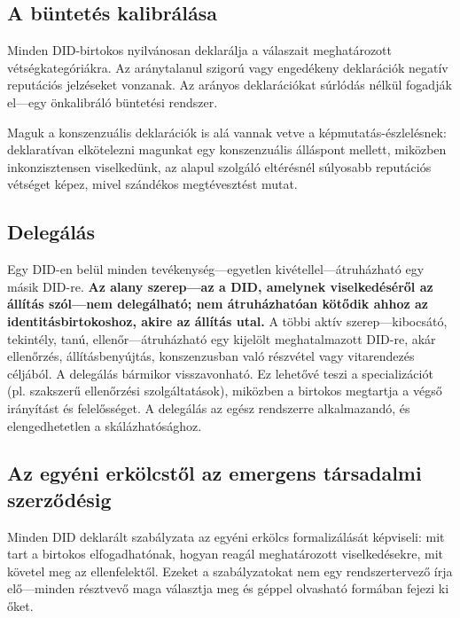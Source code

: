 \documentclass[11pt,a4paper,twocolumn]{article}
\begin{document}
\subsection{A büntetés kalibrálása}

Minden DID-birtokos nyilvánosan deklarálja a válaszait meghatározott vétségkategóriákra. Az aránytalanul szigorú vagy engedékeny deklarációk negatív reputációs jelzéseket vonzanak. Az arányos deklarációkat súrlódás nélkül fogadják el---egy önkalibráló büntetési rendszer.

Maguk a konszenzuális deklarációk is alá vannak vetve a képmutatás-észlelésnek: deklaratívan elkötelezni magunkat egy konszenzuális álláspont mellett, miközben inkonzisztensen viselkedünk, az alapul szolgáló eltérésnél súlyosabb reputációs vétséget képez, mivel szándékos megtévesztést mutat.

\subsection{Delegálás}

Egy DID-en belül minden tevékenység---egyetlen kivétellel---átruházható egy másik DID-re. \textbf{Az alany szerep---az a DID, amelynek viselkedéséről az állítás szól---nem delegálható; nem átruházhatóan kötődik ahhoz az identitásbirtokoshoz, akire az állítás utal.} A többi aktív szerep---kibocsátó, tekintély, tanú, ellenőr---átruházható egy kijelölt meghatalmazott DID-re, akár ellenőrzés, állításbenyújtás, konszenzusban való részvétel vagy vitarendezés céljából. A delegálás bármikor visszavonható. Ez lehetővé teszi a specializációt (pl. szakszerű ellenőrzési szolgáltatások), miközben a birtokos megtartja a végső irányítást és felelősséget. A delegálás az egész rendszerre alkalmazandó, és elengedhetetlen a skálázhatósághoz.

\subsection{Az egyéni erkölcstől az emergens társadalmi szerződésig}

Minden DID deklarált szabályzata az egyéni erkölcs formalizálását képviseli: mit tart a birtokos elfogadhatónak, hogyan reagál meghatározott viselkedésekre, mit követel meg az ellenfelektől. Ezeket a szabályzatokat nem egy rendszertervező írja elő---minden résztvevő maga választja meg és géppel olvasható formában fejezi ki őket.
\end{document}
